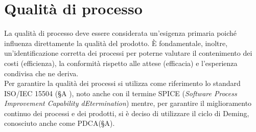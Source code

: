 \section{Qualità di processo}
La qualità di processo deve essere considerata un'esigenza primaria poiché influenza direttamente la qualità del prodotto. È fondamentale, inoltre, un'identificazione corretta dei processi per poterne valutare il contenimento dei costi (efficienza), la conformità rispetto alle attese (efficacia) e l'esperienza condivisa che ne deriva. \\
Per garantire la qualità dei processi si utilizza come riferimento lo standard ISO/IEC 15504 (§A \emph{\NdP}), noto anche con il termine SPICE (\textit{Software Process Improvement Capability dEtermination}) mentre, per garantire il miglioramento continuo dei processi e dei prodotti, si è deciso di utilizzare il ciclo di Deming, conosciuto anche come PDCA(§A).



